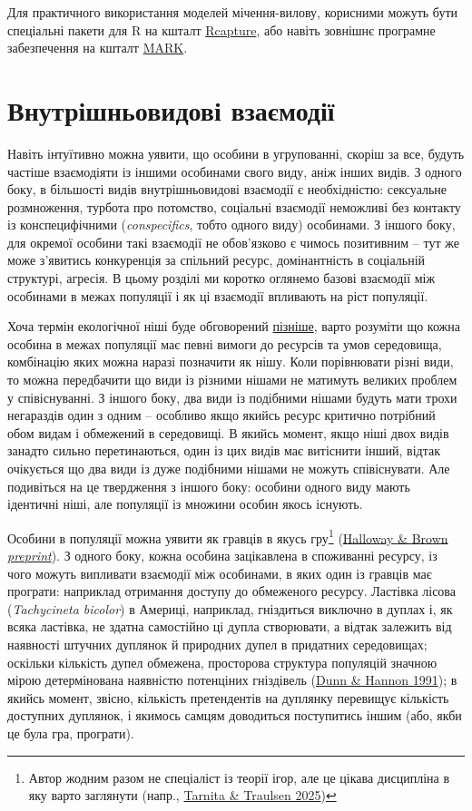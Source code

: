 \documentclass[
  11pt,
]{book}
\begin{document}
Для практичного використання моделей мічення-вилову, корисними можуть бути спеціальні пакети для R на кшталт \href{https://doi.org/10.18637/jss.v019.i05}{Rcapture}, або навіть зовнішнє програмне забезпечення на кшталт \href{http://www.phidot.org/software/mark/}{MARK}.

\section{Внутрішньовидові взаємодії}\label{intraspecific}

Навіть інтуїтивно можна уявити, що особини в угрупованні, скоріш за все, будуть частіше взаємодіяти із іншими особинами свого виду, аніж інших видів. З одного боку, в більшості видів внутрішньовидові взаємодії є необхідністю: сексуальне розмноження, турбота про потомство, соціальні взаємодії неможливі без контакту із конспецифічними (\emph{conspecifics}, тобто одного виду) особинами. З іншого боку, для окремої особини такі взаємодії не обов'язково є чимось позитивним -- тут же може з'явитись конкуренція за спільний ресурс, домінантність в соціальній структурі, агресія. В цьому розділі ми коротко оглянемо базові взаємодії між особинами в межах популяції і як ці взаємодії впливають на ріст популяції.

Хоча термін екологічної ніші буде обговорений \href{\%7B\#niche}{пізніше}, варто розуміти що кожна особина в межах популяції має певні вимоги до ресурсів та умов середовища, комбінацію яких можна наразі позначити як нішу. Коли порівнювати різні види, то можна передбачити що види із різними нішами не матимуть великих проблем у співіснуванні. З іншого боку, два види із подібними нішами будуть мати трохи негараздів один з одним -- особливо якщо якийсь ресурс критично потрібний обом видам і обмежений в середовищі. В якийсь момент, якщо ніші двох видів занадто сильно перетинаються, один із цих видів має витіснити інший, відтак очікується що два види із дуже подібними нішами не можуть співіснувати. Але подивіться на це твердження з іншого боку: особини одного виду мають ідентичні ніші, але популяції із множини особин якось існують.

Особини в популяції можна уявити як гравців в якусь гру\footnote{Автор жодним разом не спеціаліст із теорії ігор, але це цікава дисципліна в яку варто заглянути (напр., \href{https://doi.org/10.1073/pnas.2413847122}{Tarnita \& Traulsen 2025})} (\href{https://doi.org/10.1101/2021.09.04.458988}{Halloway \& Brown \emph{preprint}}). З одного боку, кожна особина зацікавлена в споживанні ресурсу, із чого можуть випливати взаємодії між особинами, в яких один із гравців має програти: наприклад отримання доступу до обмеженого ресурсу. Ластівка лісова (\emph{Tachycineta bicolor}) в Америці, наприклад, гніздиться виключно в дуплах і, як всяка ластівка, не здатна самостійно ці дупла створювати, а відтак залежить від наявності штучних дуплянок й природних дупел в придатних середовищах; оскільки кількість дупел обмежена, просторова структура популяцій значною мірою детермінована наявністю потенціних гніздівель (\href{https://doi.org/10.1093/beheco/2.3.258}{Dunn \& Hannon 1991}); в якийсь момент, звісно, кількість претендентів на дуплянку перевищує кількість доступних дуплянок, і якимось самцям доводиться поступитись іншим (або, якби це була гра, програти).
\end{document}
